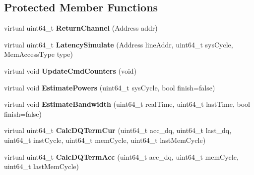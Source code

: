 \subsection*{Protected Member Functions}
\begin{DoxyCompactItemize}
\item 
\hypertarget{classMemControllerBase_a5876978d498a9419a1737f739ba9da57}{virtual uint64\-\_\-t {\bfseries Return\-Channel} (Address addr)}\label{classMemControllerBase_a5876978d498a9419a1737f739ba9da57}

\item 
\hypertarget{classMemControllerBase_ab8db0d9dad3b6636e4823fb6f27ec632}{virtual uint64\-\_\-t {\bfseries Latency\-Simulate} (Address line\-Addr, uint64\-\_\-t sys\-Cycle, Mem\-Access\-Type type)}\label{classMemControllerBase_ab8db0d9dad3b6636e4823fb6f27ec632}

\item 
\hypertarget{classMemControllerBase_aedd18f1b2a1f5e2996f3a63a2318b6e3}{virtual void {\bfseries Update\-Cmd\-Counters} (void)}\label{classMemControllerBase_aedd18f1b2a1f5e2996f3a63a2318b6e3}

\item 
\hypertarget{classMemControllerBase_a4839d77437ef24c9db6ac2cf00c1fb43}{virtual void {\bfseries Estimate\-Powers} (uint64\-\_\-t sys\-Cycle, bool finish=false)}\label{classMemControllerBase_a4839d77437ef24c9db6ac2cf00c1fb43}

\item 
\hypertarget{classMemControllerBase_a13d9efb4d902b74dd4b2deda7181906f}{virtual void {\bfseries Estimate\-Bandwidth} (uint64\-\_\-t real\-Time, uint64\-\_\-t last\-Time, bool finish=false)}\label{classMemControllerBase_a13d9efb4d902b74dd4b2deda7181906f}

\item 
\hypertarget{classMemControllerBase_a11fc2734502345a5a106a4626d64b418}{virtual uint64\-\_\-t {\bfseries Calc\-D\-Q\-Term\-Cur} (uint64\-\_\-t acc\-\_\-dq, uint64\-\_\-t last\-\_\-dq, uint64\-\_\-t inst\-Cycle, uint64\-\_\-t mem\-Cycle, uint64\-\_\-t last\-Mem\-Cycle)}\label{classMemControllerBase_a11fc2734502345a5a106a4626d64b418}

\item 
\hypertarget{classMemControllerBase_a2a4f871e47c0a60424db4f2e28b4aef7}{virtual uint64\-\_\-t {\bfseries Calc\-D\-Q\-Term\-Acc} (uint64\-\_\-t acc\-\_\-dq, uint64\-\_\-t mem\-Cycle, uint64\-\_\-t last\-Mem\-Cycle)}\label{classMemControllerBase_a2a4f871e47c0a60424db4f2e28b4aef7}


\end{DoxyCompactItemize}
